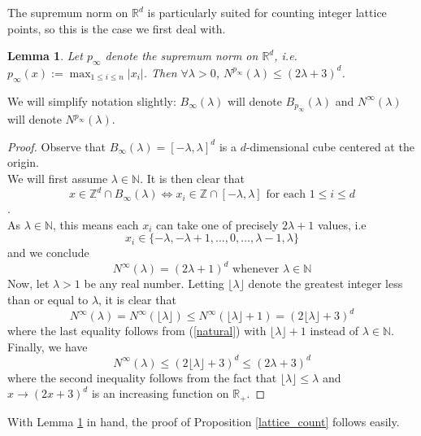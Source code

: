 \documentclass[11pt,lettersize,reqno,fullpage]{amsart}
\newtheorem{lmm}[thm]{Lemma}
\begin{document}
The supremum norm on $\mathbb{R}^d$ is particularly suited for counting integer lattice points, so this is the case we first deal with.  
\begin{lmm}
	\label{sup_norm}
	Let $p_{\infty}$ denote the supremum norm on $\mathbb{R}^d$, i.e. \(p_{\infty}(x) := \max_{1 \leq i \leq n}|x_i|\). Then $\forall \lambda > 0$, $N^{p_{\infty}}(\lambda) \leq (2\lambda + 3)^d $.
\end{lmm}
We will simplify notation slightly:  $B_{\infty}(\lambda)$ will denote $B_{p_{\infty}}(\lambda)$ and $N^{\infty}(\lambda)$ will denote $N^{p_{\infty}}(\lambda)$.
\begin{proof}
	Observe that $B_{\infty}(\lambda) = [-\lambda,\lambda]^d$ is a $d$-dimensional cube centered at the origin. \\We will first assume $\lambda \in \mathbb{N}$. It is then clear that  \[x \in \mathbb{Z}^d \cap B_{\infty}(\lambda) \iff x_i \in \mathbb{Z} \cap [-\lambda,\lambda] \text{ for each } 1 \leq i \leq d\]. \\
	As $\lambda \in \mathbb{N}$, this means each $x_i$ can take one of precisely $2\lambda + 1$ values, i.e \[x_i \in \{-\lambda, -\lambda +1, \ldots, 0, \ldots ,\lambda-1, \lambda\}\]
	and we conclude \begin{equation}
		N^{\infty}(\lambda) = (2\lambda+1)^d \text{ whenever } \lambda \in \mathbb{N}
		\label{natural}
	\end{equation}
	Now, let $\lambda > 1$ be any real number. Letting $\lfloor \lambda \rfloor$ denote the greatest integer less than or equal to $\lambda$, it is clear that \[N^{\infty}(\lambda) = N^{\infty}(\lfloor \lambda \rfloor) \leq N^{\infty}(\lfloor \lambda \rfloor + 1) = (2\lfloor\lambda\rfloor + 3)^d\]
	where the last equality follows from (\ref{natural}) with $\lfloor \lambda \rfloor + 1$ instead of $\lambda \in \mathbb{N}$.\\
	Finally, we have \[N^{\infty}(\lambda) \leq (2\lfloor\lambda\rfloor + 3)^d \leq (2\lambda + 3)^d \] where the second inequality follows from the fact that $\lfloor \lambda \rfloor \leq \lambda$ and $x \to (2x+3)^d$ is an increasing function on $\mathbb{R}_+$.
\end{proof}

With Lemma \ref{sup_norm} in hand, the proof of Proposition \ref{lattice_count} follows easily.
\end{document}
